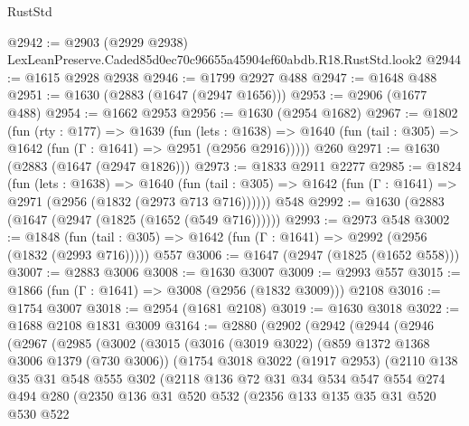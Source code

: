\begin{lexlean}{RustStd}
\begin{coremodule}
@2942 := @2903 (@2929 @2938) LexLeanPreserve.Caded85d0ec70c96655a45904ef60abdb.R18.RustStd.look2
@2944 := @1615 @2928 @2938
@2946 := @1799 @2927 @488
@2947 := @1648 @488
@2951 := @1630 (@2883 (@1647 (@2947 @1656)))
@2953 := @2906 (@1677 @488)
@2954 := @1662 @2953
@2956 := @1630 (@2954 @1682)
@2967 := @1802
    (fun (rty : @177) =>
    @1639
      (fun (lets : @1638) =>
      @1640 (fun (tail : @305) => @1642 (fun (Γ : @1641) => @2951 (@2956 @2916)))))
    @260
@2971 := @1630 (@2883 (@1647 (@2947 @1826)))
@2973 := @1833 @2911 @2277
@2985 := @1824
    (fun (lets : @1638) =>
    @1640 (fun (tail : @305) => @1642 (fun (Γ : @1641) => @2971 (@2956 (@1832 (@2973 @713 @716))))))
    @548
@2992 := @1630 (@2883 (@1647 (@2947 (@1825 (@1652 (@549 @716))))))
@2993 := @2973 @548
@3002 := @1848
    (fun (tail : @305) => @1642 (fun (Γ : @1641) => @2992 (@2956 (@1832 (@2993 @716)))))
    @557
@3006 := @1647 (@2947 (@1825 (@1652 @558)))
@3007 := @2883 @3006
@3008 := @1630 @3007
@3009 := @2993 @557
@3015 := @1866 (fun (Γ : @1641) => @3008 (@2956 (@1832 @3009))) @2108
@3016 := @1754 @3007
@3018 := @2954 (@1681 @2108)
@3019 := @1630 @3018
@3022 := @1688 @2108 @1831 @3009
@3164 := @2880
    (@2902
      (@2942
        (@2944
          (@2946
            (@2967
              (@2985
                (@3002
                  (@3015
                    (@3016
                      (@3019 @3022)
                      (@859 @1372 @1368 @3006 @1379 (@730 @3006))
                      (@1754
                        @3018
                        @3022
                        (@1917 @2953)
                        (@2110
                          @138
                          @35
                          @31
                          @548
                          @555
                          @302
                          (@2118
                            @136
                            @72
                            @31
                            @34
                            @534
                            @547
                            @554
                            @274
                            @494
                            @280
                            (@2350
                              @136
                              @31
                              @520
                              @532
                              (@2356
                                @133
                                @135
                                @35
                                @31
                                @520
                                @530
                                @522

\end{coremodule}
\end{lexlean}

